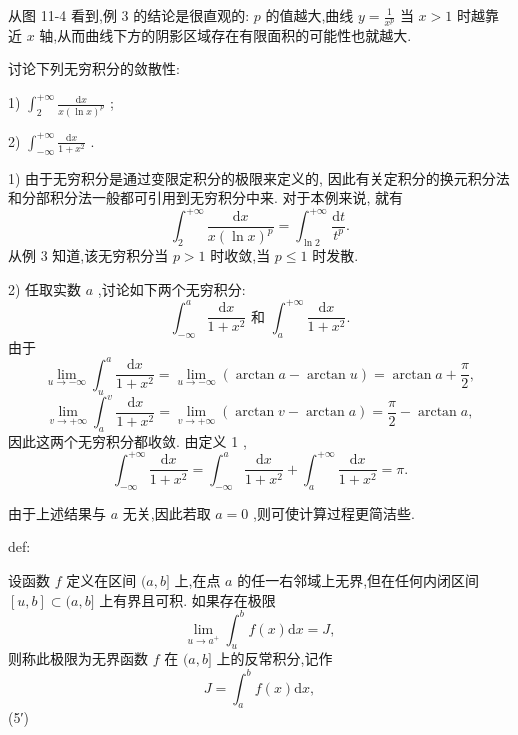 从图 11-4 看到,例 3 的结论是很直观的: \(p\) 的值越大,曲线 \(y = \frac{1}{{x}^{p}}\) 当 \(x > 1\) 时越靠近 \(x\) 轴,从而曲线下方的阴影区域存在有限面积的可能性也就越大.

\begin{example}

\end{example}
讨论下列无穷积分的敛散性:

1) \({\int }_{2}^{+\infty }\frac{\mathrm{d}x}{x{\left( \ln x\right) }^{p}}\) ;

2) \({\int }_{-\infty }^{+\infty }\frac{\mathrm{d}x}{1 + {x}^{2}}\) .

\begin{solution}

\end{solution}
1) 由于无穷积分是通过变限定积分的极限来定义的, 因此有关定积分的换元积分法和分部积分法一般都可引用到无穷积分中来. 对于本例来说, 就有
\[
{\int }_{2}^{+\infty }\frac{\mathrm{d}x}{x{\left( \ln x\right) }^{p}} = {\int }_{\ln 2}^{+\infty }\frac{\mathrm{d}t}{{t}^{p}}.
\]
从例 3 知道,该无穷积分当 \(p > 1\) 时收敛,当 \(p \leq  1\) 时发散.

2) 任取实数 \(a\) ,讨论如下两个无穷积分:
\[
{\int }_{-\infty }^{a}\frac{\mathrm{d}x}{1 + {x}^{2}}\text{ 和 }{\int }_{a}^{+\infty }\frac{\mathrm{d}x}{1 + {x}^{2}}.
\]
由于
\[
\mathop{\lim }\limits_{{u \rightarrow   - \infty }}{\int }_{u}^{a}\frac{\mathrm{d}x}{1 + {x}^{2}} = \mathop{\lim }\limits_{{u \rightarrow   - \infty }}\left( {\arctan a - \arctan u}\right)  = \arctan a + \frac{\pi }{2},
\]
\[
\mathop{\lim }\limits_{{v \rightarrow   + \infty }}{\int }_{a}^{v}\frac{\mathrm{d}x}{1 + {x}^{2}} = \mathop{\lim }\limits_{{v \rightarrow   + \infty }}\left( {\arctan v - \arctan a}\right)  = \frac{\pi }{2} - \arctan a,
\]
因此这两个无穷积分都收敛. 由定义 1 ,
\[
{\int }_{-\infty }^{+\infty }\frac{\mathrm{d}x}{1 + {x}^{2}} = {\int }_{-\infty }^{a}\frac{\mathrm{d}x}{1 + {x}^{2}} + {\int }_{a}^{+\infty }\frac{\mathrm{d}x}{1 + {x}^{2}} = \pi .
\]
\begin{remark}

\end{remark}
由于上述结果与 \(a\) 无关,因此若取 \(a = 0\) ,则可使计算过程更简洁些.

\begin{definition}{}{def:}

\end{definition}
设函数 \(f\) 定义在区间 \((a,b\rbrack\) 上,在点 \(a\) 的任一右邻域上无界,但在任何内闭区间 \(\left\lbrack  {u,b}\right\rbrack   \subset  (a,b\rbrack\) 上有界且可积. 如果存在极限
\[
\mathop{\lim }\limits_{{u \rightarrow  {a}^{ + }}}{\int }_{u}^{b}f\left( x\right) \mathrm{d}x = J, \tag{5}
\]
则称此极限为无界函数 \(f\) 在 \((a,b\rbrack\) 上的反常积分,记作
\[
J = {\int }_{a}^{b}f\left( x\right) \mathrm{d}x,
\]
 (5′)

